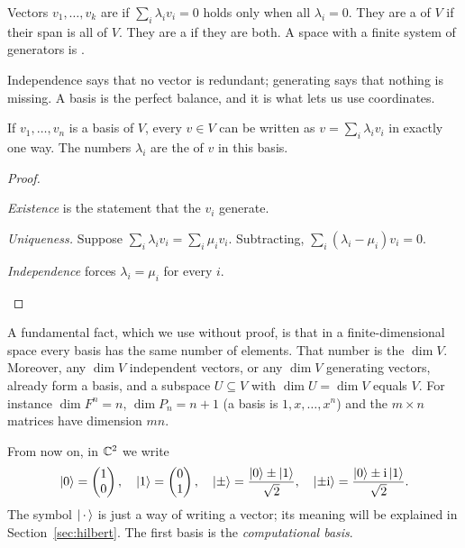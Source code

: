 \begin{definition}\label{def:basis}
  Vectors $v_1,\dots,v_k$ are  if $\sum_i\lambda_iv_i=0$ holds only when all $\lambda_i=0$. They are a  of $V$ if their span is all of $V$. They are a  if they are both. A space with a finite system of generators is .
\end{definition}

Independence says that no vector is redundant; generating says that nothing is missing. A basis is the perfect balance, and it is what lets us use coordinates.

\begin{theorem}[Coordinates]\label{thm:coords}
  If $v_1,\dots,v_n$ is a basis of $V$, every $v\in V$ can be written as $v=\sum_i\lambda_iv_i$ in exactly one way. The numbers $\lambda_i$ are the  of $v$ in this basis.
\end{theorem}
\begin{proof}
  \begin{steps}
    \item \emph{Existence} is the statement that the $v_i$ generate.
    \item \emph{Uniqueness.} Suppose $\sum_i\lambda_iv_i=\sum_i\mu_iv_i$. Subtracting, $\sum_i(\lambda_i-\mu_i)v_i=0$.
    \item \emph{Independence} forces $\lambda_i=\mu_i$ for every $i$. \qedhere
  \end{steps}
\end{proof}

A fundamental fact, which we use without proof, is that in a finite-dimensional space every basis has the same number of elements. That number is the  $\dim V$. Moreover, any $\dim V$ independent vectors, or any $\dim V$ generating vectors, already form a basis, and a subspace $U\subseteq V$ with $\dim U=\dim V$ equals $V$.
For instance $\dim F^n=n$, $\dim P_n=n+1$ (a basis is $1,x,\dots,x^n$) and the $m\times n$ matrices have dimension $mn$.

From now on, in $\mathbb{C}^2$ we write
\[
  \left|0\right\rangle=\begin{pmatrix}1\\0\end{pmatrix},\quad \left|1\right\rangle=\begin{pmatrix}0\\1\end{pmatrix},\quad \left|\pm\right\rangle=\frac{\left|0\right\rangle\pm\left|1\right\rangle}{\sqrt2},\quad \left|\pm\mathrm{i}\right\rangle=\frac{\left|0\right\rangle\pm\mathrm{i}\left|1\right\rangle}{\sqrt2}.
\]
The symbol $\left|\,\cdot\,\right\rangle$ is just a way of writing a vector; its meaning will be explained in Section~\ref{sec:hilbert}. The first basis is the \emph{computational basis}.

